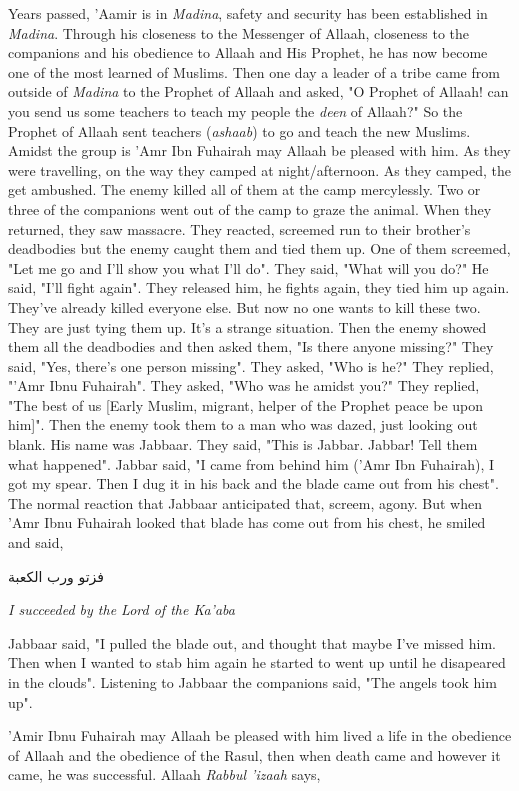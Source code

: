 {Years passed, 'Aamir is in \textit{Madina}, safety and security has been established in \textit{Madina}. Through his closeness to the Messenger of Allaah, closeness to the companions and his obedience to Allaah and His Prophet, he has now become one of the most learned of Muslims. Then one day a leader of a tribe came from outside of \textit{Madina} to the Prophet of Allaah and asked, "O Prophet of Allaah! can you send us some teachers to teach my people the \textit{deen} of Allaah?" So the Prophet of Allaah sent teachers (\textit{ashaab}) to go and teach the new Muslims. Amidst the group is 'Amr Ibn Fuhairah may Allaah be pleased with him. As they were travelling, on the way they camped at night/afternoon. As they camped, the get ambushed. The enemy killed all of them at the camp mercylessly. Two or three of the companions went out of the camp to graze the animal. When they returned, they saw massacre. They reacted, screemed run to their brother's deadbodies but the enemy caught them and tied them up. One of them screemed, "Let me go and I'll show you what I'll do". They said, "What will you do?" He said, "I'll fight again". They released him, he fights again, they tied him up again. They've already killed everyone else. But now no one wants to kill these two. They are just tying them up. It's a strange situation. Then the enemy showed them all the deadbodies and then asked them, "Is there anyone missing?" They said, "Yes, there's one person missing". They asked, "Who is he?" They replied, "'Amr Ibnu Fuhairah". They asked, "Who was he amidst you?" They replied, "The best of us [Early Muslim, migrant, helper of the Prophet peace be upon him]". Then the enemy took them to a man who was dazed, just looking out blank. His name was Jabbaar. They said, "This is Jabbar. Jabbar! Tell them what happened". Jabbar said, "I came from behind him ('Amr Ibn Fuhairah), I got my spear. Then I dug it in his back and the blade came out from his chest". The normal reaction that Jabbaar anticipated that, screem, agony. But when 'Amr Ibnu Fuhairah looked that blade has come out from his chest, he smiled and said,   
\begin{center}
    \begin{RLtext}
        فزتو ورب الكعبة
    \end{RLtext}
    \textit{I succeeded by the Lord of the Ka'aba}
\end{center}
Jabbaar said, "I pulled the blade out, and thought that maybe I've missed him. Then when I wanted to stab him again he started to went up until he disapeared in the clouds". Listening to Jabbaar the companions said, "The angels took him up".

'Amir Ibnu Fuhairah may Allaah be pleased with him lived a life in the obedience of Allaah and the obedience of the Rasul, then when death came and however it came, he was successful. Allaah \textit{Rabbul 'izaah} says,
}
